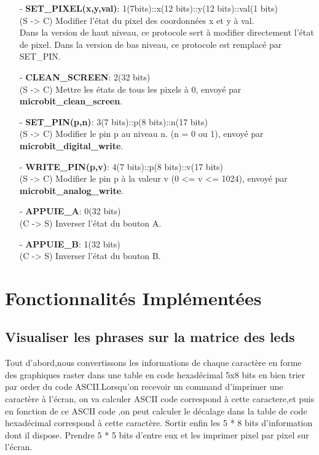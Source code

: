 \documentclass[14px]{article}
\begin{document}
\begin{enumerate}
\item[-] \textbf{SET\_PIXEL(x,y,val)}: 1(7bits)::x(12 bits)::y(12 bits)::val(1 bits)\\
(S -> C) Modifier l'état du pixel des coordonnées x et y à val.\\
Dans la version de haut niveau, ce protocole sert à modifier directement l'état de pixel. Dans la version de bas niveau, ce protocole est remplacé par SET\_PIN.

\item[-] \textbf{CLEAN\_SCREEN}: 2(32 bits)\\
(S -> C) Mettre les états de tous les pixels à 0, envoyé par \textbf{microbit\_clean\_screen}.

\item[-] \textbf{SET\_PIN(p,n)}: 3(7 bits)::p(8 bits)::n(17 bits)\\
(S -> C) Modifier le pin p au niveau n. (n = 0 ou 1), envoyé par \textbf{microbit\_digital\_write}.

\item[-] \textbf{WRITE\_PIN(p,v)}: 4(7 bits)::p(8 bits)::v(17 bits)\\
(S -> C) Modifier le pin p à la valeur v (0 <= v <= 1024), envoyé par \textbf{microbit\_analog\_write}.

\item[-] \textbf{APPUIE\_A}: 0(32 bits)\\
(C -> S) Inverser l'état du bouton A.

\item[-] \textbf{APPUIE\_B}: 1(32 bits)\\
(C -> S) Inverser l'état du bouton B.
\end{enumerate}

\clearpage

\section{Fonctionnalités Implémentées}
\subsection{Visualiser les phrases sur la matrice des leds}
Tout d'abord,nous convertissons les informations de chaque caractère en forme des graphiques raster dans une table en code hexadécimal 5x8 bits en bien trier par order du code ASCII.Lorsqu'on recevoir un command d'imprimer une caractère à l'écran,
on va calculer ASCII code correspond à cette caractere,et puis en fonction de ce ASCII code ,on peut calculer le décalage dans la table de code hexadécimal correspond à cette caractère. Sortir enfin les 5 * 8 bits d'information dont il dispose. Prendre 5 * 5 bits d'entre eux et les imprimer pixel par pixel sur l'écran.\\
\end{document}
